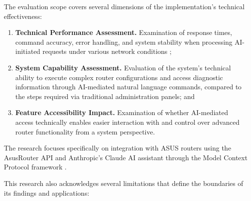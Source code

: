 The evaluation scope covers several dimensions of the implementation's technical effectiveness:

\begin{enumerate}
\item \textbf{Technical Performance Assessment.} Examination of response times, command accuracy, error handling, and system stability when processing AI-initiated requests under various network conditions \cite{ai_infrastructure};

\item \textbf{System Capability Assessment.} Evaluation of the system's technical ability to execute complex router configurations and access diagnostic information through AI-mediated natural language commands, compared to the steps required via traditional administration panels; and

\item \textbf{Feature Accessibility Impact.} Examination of whether AI-mediated access technically enables easier interaction with and control over advanced router functionality from a system perspective.
\end{enumerate}

The research focuses specifically on integration with ASUS routers using the AsusRouter API and Anthropic's Claude AI assistant through the Model Context Protocol framework \cite{mcp_intro}.

This research also acknowledges several limitations that define the boundaries of its findings and applications:


